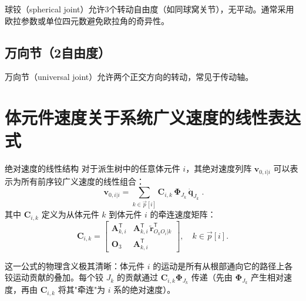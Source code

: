\documentclass[10pt,a4paper]{book}
\theoremstyle{thmstyle}
\theoremstyle{defstyle}
\theoremstyle{prostyle}
\newcommand{\T}{^{\mathsf{T}}}
\renewcommand{\vec}[1]{\bm{#1}}
\newcommand{\mat}[1]{\bm{#1}}
\newcommand{\tildev}[1]{\tilde{#1}}
\begin{document}
球铰（spherical joint）允许3个转动自由度（如同球窝关节），无平动。通常采用欧拉参数或单位四元数避免欧拉角的奇异性。

\subsection{万向节（2自由度）}

万向节（universal joint）允许两个正交方向的转动，常见于传动轴。


\section{体元件速度关于系统广义速度的线性表达式}

\begin{myTheorem}{绝对速度的线性结构}
对于派生树中的任意体元件 $i$，其绝对速度列阵 $\vec{v}_{0,i|i}$ 可以表示为所有前序铰广义速度的线性组合：
\begin{equation}
\boxed{\;\vec{v}_{0,i|i} = \sum_{k\in\overrightarrow{p}[i]} \mat{C}_{i,k}\,\mat{\Phi}_{J_k}\,\dot{\vec{q}}_{J_k}\;}.
\label{eq:vel_linear}
\end{equation}
其中 $\mat{C}_{i,k}$ 定义为从体元件 $k$ 到体元件 $i$ 的牵连速度矩阵：
\begin{equation}
\mat{C}_{i,k} =
\begin{bmatrix}
\mat{A}_{k,i}\T & \mat{A}_{k,i}\T\,\tildev{\vec{r}}_{O_kO_i|k}\T \\[4pt]
\mat{O}_3 & \mat{A}_{k,i}\T
\end{bmatrix},\quad k \in \overrightarrow{p}[i].
\label{eq:C_ik}
\end{equation}
\end{myTheorem}

这一公式的物理含义极其清晰：体元件 $i$ 的运动是所有从根部通向它的路径上各铰运动贡献的叠加。每个铰 $J_k$ 的贡献通过 $\mat{C}_{i,k}\mat{\Phi}_{J_k}$ 传递（先由 $\mat{\Phi}_{J_k}$ 产生相对速度，再由 $\mat{C}_{i,k}$ 将其"牵连"为 $i$ 系的绝对速度）。
\end{document}
